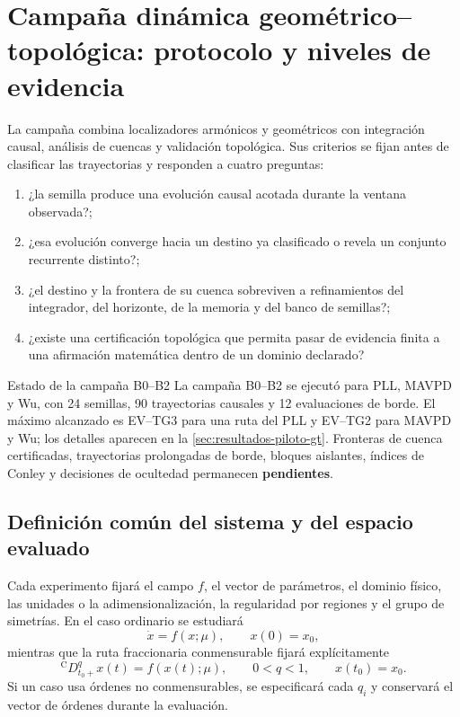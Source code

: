 \section[Campaña geométrico--topológica]
{Campaña dinámica geométrico--topológica: protocolo y niveles de evidencia}
\label{sec:campana-gt}

La campaña combina localizadores armónicos y geométricos con integración
causal, análisis de cuencas y validación topológica. Sus criterios se fijan
antes de clasificar las trayectorias y responden a cuatro preguntas:

\begin{enumerate}
  \item ¿la semilla produce una evolución causal acotada durante la ventana
        observada?;
  \item ¿esa evolución converge hacia un destino ya clasificado o revela un
        conjunto recurrente distinto?;
  \item ¿el destino y la frontera de su cuenca sobreviven a refinamientos del
        integrador, del horizonte, de la memoria y del banco de semillas?;
  \item ¿existe una certificación topológica que permita pasar de evidencia
        finita a una afirmación matemática dentro de un dominio declarado?
\end{enumerate}

\begin{hallazgo}{Estado de la campaña B0--B2}
La campaña B0--B2 se ejecutó para PLL, MAVPD y Wu, con 24 semillas,
90 trayectorias causales y 12 evaluaciones de borde. El máximo alcanzado es
EV--TG3 para una ruta del PLL y EV--TG2 para MAVPD y Wu; los detalles aparecen
en la \cref{sec:resultados-piloto-gt}. Fronteras de cuenca certificadas,
trayectorias prolongadas de borde, bloques aislantes, índices de Conley y
decisiones de ocultedad permanecen \textbf{pendientes}.
\end{hallazgo}


\subsection{Definición común del sistema y del espacio evaluado}
\label{camp:contrato-comun}

Cada experimento fijará el campo \(f\), el
vector de parámetros, el dominio físico, las unidades o la
adimensionalización, la regularidad por regiones y el grupo de simetrías. En
el caso ordinario se estudiará
\begin{equation}
 \dot x=f(x;\mu),\qquad x(0)=x_0,
 \label{camp:eq-ode-contract}
\end{equation}
mientras que la ruta fraccionaria conmensurable fijará explícitamente
\begin{equation}
 {}^{\mathrm C}D_{t_0+}^{q}x(t)=f(x(t);\mu),
 \qquad 0<q<1,\qquad x(t_0)=x_0.
 \label{camp:eq-caputo-contract}
\end{equation}
Si un caso usa órdenes no conmensurables, se especificará cada \(q_i\) y
conservará el vector de órdenes durante la evaluación.

